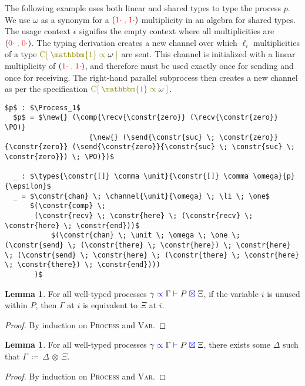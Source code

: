 \documentclass[a4paper,UKenglish,cleveref, autoref, thm-restate,authorcolumns]{lipics-v2019}
\theoremstyle{definition}
\newtheorem{nilemma}[theorem]{Lemma}
\newcommand{\type}[1]{\textcolor{blue}{\operatorname{#1}}}
\newcommand{\constr}[1]{\textcolor{olive}{\operatorname{#1}}}
\newcommand{\field}[1]{\textcolor{red}{\operatorname{#1}}}
\newcommand{\PO}{\constr{\mathbf{0}}}
\newcommand{\comp}[2]{#1 \; \constr{\parallel} \; #2}
\newcommand{\new}{\constr{\boldsymbol{\nu}} \;}
\newcommand{\send}[2]{#1 \; \constr{\langle} \; #2 \;\constr{\rangle} \;}
\newcommand{\recv}[1]{#1 \; \constr{\mathbb{()}} \;}
\newcommand{\unit}{\constr{\mathbbm{1}}}
\newcommand{\channel}[2]{\constr{C[} \; #1 \; \constr{\propto} \; #2 \; \constr{]}}
\newcommand{\comma}{\; \constr{,} \;}
\newcommand{\opctx}[3]{#1 \, \coloneqq \, #2 \, \otimes \, #3}
\newcommand{\zero}{\field{0\cdot}}
\newcommand{\one}{\field{1\cdot}}
\newcommand{\li}{\ell_i}
\newcommand{\types}[4]{#1 \; \type{\propto} \; #2 \; \type{\vdash} \; #3 \; \type{\boxtimes} \; #4}
\newcommand{\Process}{\type{PROCESS}}
\begin{document}
\begin{example}
  \label{example-derivations}
  The following example uses both linear and shared types to type the process $p$. 
  We use $\omega$ as a synonym for a $(\one \comma \one)$ multiplicity in an algebra for shared types.
  The usage context $\epsilon$ signifies the empty context where all multiplicities are $(\zero \comma \zero)$.
  The typing derivation creates a new channel over which $\li$ multiplicities of a type $\channel{\unit}{\omega}$ are sent.
  This channel is initialized with a linear multiplicity of $(\one \comma \one)$, and therefore must be used exactly once for sending and once for receiving.
  The right-hand parallel subprocess then creates a new channel as per the specification $\channel{\unit}{\omega}$.
  
  \begin{lstlisting}[mathescape]
  $p$ : $\Process_1$
  $p$ = $\new{} (\comp{\recv{\constr{zero}} (\recv{\constr{zero}} \PO)}
                    {\new{} (\send{\constr{suc} \; \constr{zero}} {\constr{zero}} (\send{\constr{zero}}{\constr{suc} \; \constr{suc} \; \constr{zero}}) \; \PO)})$

  _ : $\types{\constr{[]} \comma \unit}{\constr{[]} \comma \omega}{p}{\epsilon}$
  _ = $\constr{chan} \; \channel{\unit}{\omega} \; \li \; \one$
      $(\constr{comp} \;
       (\constr{recv} \; \constr{here} \; (\constr{recv} \; \constr{here} \; \constr{end}))$
           $(\constr{chan} \; \unit \; \omega \; \one \; (\constr{send} \; (\constr{there} \; \constr{here}) \; \constr{here} \; (\constr{send} \; \constr{here} \; (\constr{there} \; \constr{here} \; \constr{there}) \; \constr{end})))
       )$
  \end{lstlisting}
\end{example}

\begin{nilemma}
  \label{lm:types-unused}
  For all well-typed processes $\types{\gamma}{\Gamma}{P}{\Xi}$, if the variable $i$ is unused within $P$, then $\Gamma$ at $i$ is equivalent to $\Xi$ at $i$.
\end{nilemma}
\begin{proof}
  By induction on \textsc{Process} and \textsc{Var}.
\end{proof}

\begin{nilemma}
  \label{lm:types-op}
  For all well-typed processes $\types{\gamma}{\Gamma}{P}{\Xi}$, there exists some $\Delta$ such that $\opctx{\Gamma}{\Delta}{\Xi}$.
\end{nilemma}
\begin{proof}
  By induction on \textsc{Process} and \textsc{Var}.
\end{proof}
\end{document}

